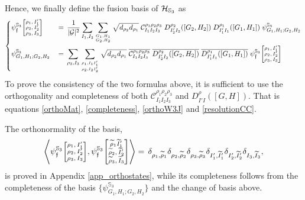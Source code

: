 \documentclass[nofootinbib,superscriptaddress,eqsecnum,tightenlines,11pt]{revtex4-1}
\def\nn{\nonumber}
\def\mG{\mathcal{G}}
\renewcommand{\S}{{\mathbb S}}
\renewcommand{\tilde}{\widetilde}
\begin{document}
Hence, we finally define the fusion basis of ${\cal H}_{\S_3}$ as
\begin{align}\label{deffus48}
\begin{dcases}
\psi^{\S_3}_{\frak f}
	 { \scriptsize\begin{bmatrix} \rho_1,I_1'\\ \rho_2,I_2'\\ \rho_3,I_3\end{bmatrix}}
&\,= \,\frac{1}{|\mG|^2} \sum_{I_1, I_2} \sum_{G_1,H_1 \atop G_2, H_2} 
 \sqrt{d_{\rho_2} d_{\rho_1} }\;
 \mathcal{C}^{\rho_1 \rho_2\rho_3}_{I_1 I_2 I_3}\;
 {D^{\rho_2}_{I'_2 I_2 }([G_2,H_2 ])} \;
  {D^{\rho_1}_{I'_1 I_1}([G_1 ,H_1 ])}\;
\psi^{\S_3}_{G_1,H_1;G_2,H_2}\\
\psi^{\S_3}_{G_1,H_1;G_2,H_2}
&\,= \, \sum_{\rho_3, I_3} \sum_{\rho_1,I_1 I'_1 \atop \rho_2, I_2  I'_2 } 
 \sqrt{d_{\rho_2} d_{\rho_1} }\;
 \overline{\mathcal{C}^{\rho_1 \rho_2\rho_3}_{I_1 I_2 I_3}}\;
 \overline{{D^{\rho_2}_{I'_2 I_2 }([G_2,H_2 ])}} \;
  \overline{{D^{\rho_1}_{I'_1 I_1}([G_1 ,H_1 ])}}\;
\psi^{\S_3}_{\frak f} { \scriptsize\begin{bmatrix} \rho_1,I_1'\\ \rho_2,I_2'\\ \rho_3,I_3\end{bmatrix}}
\end{dcases}
\end{align} 
To prove the consistency of the two formulas above, it is sufficient to use the orthogonality and completeness of both $ \mathcal{C}^{\rho_1 \rho_2\rho_3}_{I_1 I_2 I_3}$ and ${D^{\rho}_{I' I}([G ,H  ])}$. That is equations \eqref{orthoMat}, \eqref{completeness}, \eqref{orthoW3J} and \eqref{resolutionCC}.

The  orthonormality of the basis,
\begin{align}\nn
\Bigg\langle \psi^{\S_3}_{\mathfrak{f}}
	{ \scriptsize\begin{bmatrix}
		\rho_1,I_1' \\ \rho_2,I_2' \\ \rho_3,I_3
	\end{bmatrix}},
	\psi^{\S_3}_{\mathfrak{f}}
	{ \scriptsize\begin{bmatrix}
		\widetilde{\rho}_1\tilde{I}_1' \\ \widetilde{\rho}_2,\tilde{I}_2' \\ \widetilde{\rho}_3,\tilde{I}_3
	\end{bmatrix}} \Bigg\rangle 
 = \, \delta_{\rho_1,\widetilde{\rho}_1}\delta_{\rho_2,\widetilde{\rho}_2}\delta_{\rho_3,\widetilde{\rho}_3}\delta_{I_1',\tilde{I}_1'}\delta_{I_2',\tilde{I}_2'}\delta_{I_3,\tilde{I}_3},
\end{align} 
is proved in Appendix \ref{app_orthostates}, while its completeness follows from the completeness of the basis $\{\psi^{\S_3}_{G_1,H_1; G_2, H_2}\}$ and the change of basis above.
\end{document}
